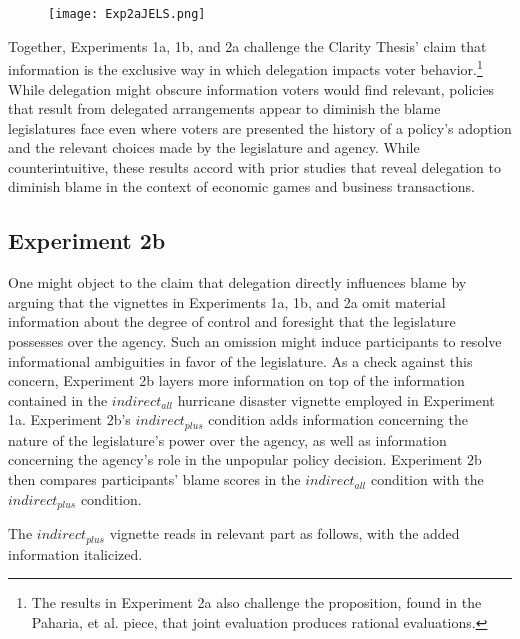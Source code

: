 \documentclass{article}
\begin{document}
\begin{figure}[htb]
\begin{center}
\texttt{[image: Exp2aJELS.png]}
\end{center}
\end{figure}

Together, Experiments 1a, 1b, and 2a challenge the Clarity Thesis' claim that information is the exclusive way in which delegation impacts voter behavior.\footnote{The results in Experiment 2a also challenge the proposition, found in the Paharia, et al. piece, that joint evaluation produces rational evaluations.} While delegation might obscure information voters would find relevant, policies that result from delegated arrangements appear to diminish the blame legislatures face even where voters are presented the history of a policy's adoption and the relevant choices made by the legislature and agency. While counterintuitive, these results accord with prior studies that reveal delegation to diminish blame in the context of economic games and business transactions.  

\subsection{Experiment 2b}

One might object to the claim that delegation directly influences blame by arguing that the vignettes in Experiments 1a, 1b, and 2a omit material information about the degree of control and foresight that the legislature possesses over the agency. Such an omission might induce participants to resolve informational ambiguities in favor of the legislature. As a check against this concern, Experiment 2b layers more information on top of the information contained in the $indirect_{all}$ hurricane disaster vignette employed in Experiment 1a. Experiment 2b's $indirect_{plus}$ condition adds information concerning the nature of the legislature's power over the agency, as well as information concerning the agency's role in the unpopular policy decision. Experiment 2b then compares participants' blame scores in the $indirect_{all}$ condition with the $indirect_{plus}$ condition.

The $indirect_{plus}$ vignette reads in relevant part as follows, with the added information italicized. 
\end{document}
